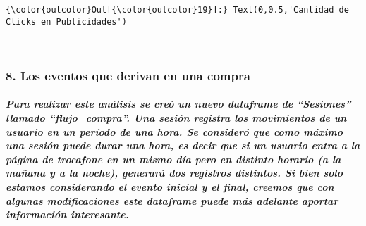 \documentclass[11pt]{article}
\begin{document}
\begin{Verbatim}[commandchars=\\\{\}]
{\color{outcolor}Out[{\color{outcolor}19}]:} Text(0,0.5,'Cantidad de Clicks en Publicidades')
\end{Verbatim}
            
    \begin{center}
    \end{center}
    { \hspace*{\fill} \\}
    
    \hypertarget{los-eventos-que-derivan-en-una-compra}{%
\subsubsection{8. Los eventos que derivan en una
compra}\label{los-eventos-que-derivan-en-una-compra}}

    \hypertarget{para-realizar-este-anuxe1lisis-se-creuxf3-un-nuevo-dataframe-de-sesiones-llamado-flujo_compra.-una-sesiuxf3n-registra-los-movimientos-de-un-usuario-en-un-peruxedodo-de-una-hora.-se-consideruxf3-que-como-muxe1ximo-una-sesiuxf3n-puede-durar-una-hora-es-decir-que-si-un-usuario-entra-a-la-puxe1gina-de-trocafone-en-un-mismo-duxeda-pero-en-distinto-horario-a-la-mauxf1ana-y-a-la-noche-generaruxe1-dos-registros-distintos.-si-bien-solo-estamos-considerando-el-evento-inicial-y-el-final-creemos-que-con-algunas-modificaciones-este-dataframe-puede-muxe1s-adelante-aportar-informaciuxf3n-interesante.}{%
\subparagraph{Para realizar este análisis se creó un nuevo dataframe de
``Sesiones'' llamado ``flujo\_compra''. Una sesión registra los
movimientos de un usuario en un período de una hora. Se consideró que
como máximo una sesión puede durar una hora, es decir que si un usuario
entra a la página de trocafone en un mismo día pero en distinto horario
(a la mañana y a la noche), generará dos registros distintos. Si bien
solo estamos considerando el evento inicial y el final, creemos que con
algunas modificaciones este dataframe puede más adelante aportar
información
interesante.}\label{para-realizar-este-anuxe1lisis-se-creuxf3-un-nuevo-dataframe-de-sesiones-llamado-flujo_compra.-una-sesiuxf3n-registra-los-movimientos-de-un-usuario-en-un-peruxedodo-de-una-hora.-se-consideruxf3-que-como-muxe1ximo-una-sesiuxf3n-puede-durar-una-hora-es-decir-que-si-un-usuario-entra-a-la-puxe1gina-de-trocafone-en-un-mismo-duxeda-pero-en-distinto-horario-a-la-mauxf1ana-y-a-la-noche-generaruxe1-dos-registros-distintos.-si-bien-solo-estamos-considerando-el-evento-inicial-y-el-final-creemos-que-con-algunas-modificaciones-este-dataframe-puede-muxe1s-adelante-aportar-informaciuxf3n-interesante.}}
\end{document}
